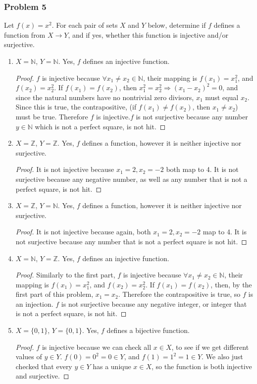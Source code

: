 \documentclass[hidelinks,12pt]{article}
\newcommand{\N}{\mathbb{N}}
\newcommand{\Z}{\mathbb{Z}}
\begin{document}
\subsubsection{Problem 5}
Let $f(x)=x^2$. For each pair of sets $X$ and $Y$ below, determine if $f$ defines a function from $X\to Y$, and if yes, whether this function is injective and/or surjective.
\begin{enumerate}
    \item $X=\N$, $Y=\N$. Yes, $f$ defines an injective function. \begin{proof}
    $f$ is injective because $\forall x_1\neq x_2\in\N$, their mapping is $f(x_1)=x_{1}^2$, and $f(x_2)=x_2^2$. If $f(x_1)=f(x_2)$, then $x_1^2=x_2^2\Longrightarrow (x_1-x_2)^2=0$, and since the natural numbers have no nontrivial zero divisors, $x_1$ must equal $x_2$. Since this is true, the contrapositive, (if $f(x_1)\neq f(x_2)$, then $x_1\neq x_2$) must be true. Therefore $f$ is injective.\newline $f$ is not surjective because any number $y\in\N$ which is not a perfect square, is not hit.\end{proof}
    \item $X=\Z$, $Y=\Z$. Yes, $f$ defines a function, however it is neither injective nor surjective. \begin{proof}
    It is not injective because $x_1=2,x_2=-2$ both map to 4. It is not surjective because any negative number, as well as any number that is not a perfect square, is not hit.\end{proof}
    \item $X=\Z$, $Y=\N$. Yes, $f$ defines a function, however it is neither injective nor surjective. \begin{proof}
    It is not injective because again, both $x_1=2,x_2=-2$ map to 4. It is not surjective because any number that is not a perfect square is not hit.\end{proof}
    \item $X=\N$, $Y=\Z$. Yes, $f$ defines an injective function. \begin{proof}
    Similarly to the first part, $f$ is injective because $\forall x_1\neq x_2\in\N$, their mapping is $f(x_1)=x_{1}^2$, and $f(x_2)=x_2^2$. If $f(x_1)=f(x_2)$, then, by the first part of this problem, $x_1=x_2$. Therefore the contrapositive is true, so $f$ is an injection. \newline $f$ is not surjective because any negative integer, or integer that is not a perfect square, is not hit.\end{proof}
    \item $X=\{0,1\}$, $Y=\{0,1\}$. Yes, $f$ defines a bijective function. \begin{proof}
    $f$ is injective because we can check all $x\in X$, to see if we get different values of $y\in Y$. $f(0)=0^2=0\in Y$, and $f(1)=1^2=1\in Y$. We also just checked that every $y\in Y$ has a unique $x\in X$, so the function is both injective and surjective.\end{proof}
\end{enumerate}
\end{document}
